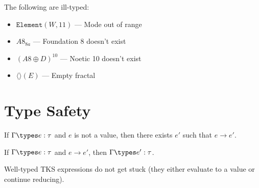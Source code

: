 \begin{definition}
\label{def:illegal}
The following are ill-typed:
\begin{itemize}
  \item $\mathtt{Element}(W, 11)$ --- Mode out of range
  \item $A8_{8a}$ --- Foundation 8 doesn't exist
  \item $(A8 \oplus D)^{10}$ --- Noetic 10 doesn't exist
  \item $\langle\rangle(E)$ --- Empty fractal
\end{itemize}
\end{definition}

\section{Type Safety}

\begin{theorem}[Progress]
\label{thm:progress}
If $\Gamma \types e : \tau$ and $e$ is not a value, then there exists $e'$ such that $e \to e'$.
\end{theorem}

\begin{theorem}[Preservation]
\label{thm:preservation}
If $\Gamma \types e : \tau$ and $e \to e'$, then $\Gamma \types e' : \tau$.
\end{theorem}

\begin{corollary}
\label{cor:type-safety}
Well-typed TKS expressions do not get stuck (they either evaluate to a value or continue reducing).
\end{corollary}



